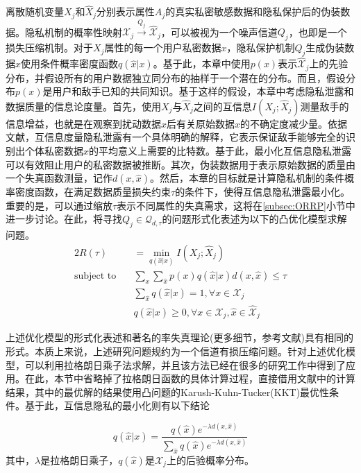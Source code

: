 离散随机变量$X_j$和$\hat{X}_j$分别表示属性$A_j$的真实私密敏感数据和隐私保护后的伪装数据。隐私机制的概率性映射$\mathcal{X}_j \xrightarrow{Q_j} \hat{\mathcal{X}}_j$，可以被视为一个噪声信道$Q_j$，也即是一个损失压缩机制。对于$X_j$属性的每一个用户私密数据$x$，隐私保护机制$Q_j$生成伪装数据$\hat{x}$使用条件概率密度函数$q(\hat{x}|x)$。基于此，本章中使用$p(x)$表示$\hat{\mathcal{X}}_j$上的先验分布，并假设所有的用户数据独立同分布的抽样于一个潜在的分布。而且，假设分布$p(x)$是用户和敌手已知的共同知识。基于这样的假设，本章中考虑隐私泄露和数据质量的信息论度量。首先，使用$X_j$与$\hat{X}_j$之间的互信息$I(X_j;\hat{X}_j)$测量敌手的信息增益，也就是在观察到扰动数据$\hat{x}$后有关原始数据$x$的不确定度减少量。依据文献，互信息度量隐私泄露有一个具体明确的解释，它表示保证敌手能够完全的识别出个体私密数据$x$的平均意义上需要的比特数。基于此，最小化互信息隐私泄露可以有效阻止用户的私密数据被推断。其次，伪装数据用于表示原始数据的质量由一个失真函数测量，记作$d(x,\hat{x})$。然后，本章的目标就是计算隐私机制的条件概率密度函数，在满足数据质量损失约束$\tau$的条件下，使得互信息隐私泄露最小化。重要的是，可以通过缩放$\tau$表示不同属性的失真需求，这将在\ref{subsec:ORRP}小节中进一步讨论。在此，将寻找$Q_j \in \mathcal{Q}_{d,\tau}$的问题形式化表述为以下的凸优化模型求解问题。
\begin{alignat}{2}
  R(\tau)  & =\min_{q(\hat{x}|x)} I(X_j;\hat{X}_j) \label{min:lp1}  \nonumber\\
   \mbox{subject to} \quad
   & \sum_{x}\sum_{\hat{x}}p(x)q(\hat{x}|x)d(x,\hat{x})\leq\tau \\
   & \sum_{\hat{x}} q(\hat{x}|x)=1,\forall x\in \mathcal{X}_j \\
   & q(\hat{x}|x)\geq 0,\forall x \in \mathcal{X}_j,\hat{x}\in \hat{\mathcal{X}}_j
   \end{alignat}

上述优化模型的形式化表述和著名的率失真理论(更多细节，参考文献)具有相同的形式\cite{wang2016on}。本质上来说，上述研究问题规约为一个信道有损压缩问题。针对上述优化模型，可以利用拉格朗日乘子法求解，并且该方法已经在很多的研究工作中得到了应用。在此，本节中省略掉了拉格朗日函数的具体计算过程，直接借用文献中的计算结果，其中的最优解的结果使用凸问题的Karush-Kuhn-Tucker(KKT)最优性条件\cite{boyd2004convex}。基于此，互信息隐私的最小化则有以下结论

 \begin{equation}\label{Eq:opt_prob}
 q(\hat{x}|x)=\frac{q(\hat{x})e^{-\lambda d(x,\hat{x})}}{\sum_{\hat{x}}q(\hat{x})e^{-\lambda d(x,\hat{x})}}
 \end{equation}
其中，$\lambda$是拉格朗日乘子，$q(\hat{x})$是$\hat{\mathcal{X}}_j$上的后验概率分布。

